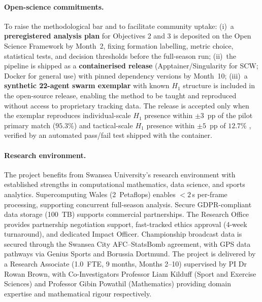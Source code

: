 \paragraph{Open-science commitments.}
To raise the methodological bar and to facilitate community uptake: (i)~a \textbf{preregistered analysis plan} for Objectives 2 and 3 is deposited on the Open Science Framework by Month~2, fixing formation labelling, metric choice, statistical tests, and decision thresholds before the full-season run; (ii)~the pipeline is shipped as a \textbf{containerised release} (Apptainer/Singularity for SCW; Docker for general use) with pinned dependency versions by Month~10; (iii)~a \textbf{synthetic 22-agent swarm exemplar} with known $H_1$ structure is included in the open-source release, enabling the method to be taught and reproduced without access to proprietary tracking data. The release is accepted only when the exemplar reproduces individual-scale $H_1$ presence within $\pm 3$~pp of the pilot primary match ($95.3\%$) and tactical-scale $H_1$ presence within $\pm 5$~pp of $12.7\%$ \citep{Brown2026}, verified by an automated pass/fail test shipped with the container.

\paragraph{Research environment.}
The project benefits from Swansea University's research environment with established strengths in computational mathematics, data science, and sports analytics. Supercomputing Wales (2~Petaflops) enables ${<}2$\,s per-frame processing, supporting concurrent full-season analysis. Secure GDPR-compliant data storage (100~TB) supports commercial partnerships. The Research Office provides partnership negotiation support, fast-tracked ethics approval (4-week turnaround), and dedicated Impact Officer. Championship broadcast data is secured through the Swansea City AFC--StatsBomb agreement, with GPS data pathways via Genius Sports and Borussia Dortmund. The project is delivered by a Research Associate (1.0~FTE, 9 months, Months 2--10) supervised by PI Dr Rowan Brown, with Co-Investigators Professor Liam Kilduff (Sport and Exercise Sciences) and Professor Gibin Powathil (Mathematics) providing domain expertise and mathematical rigour respectively.
